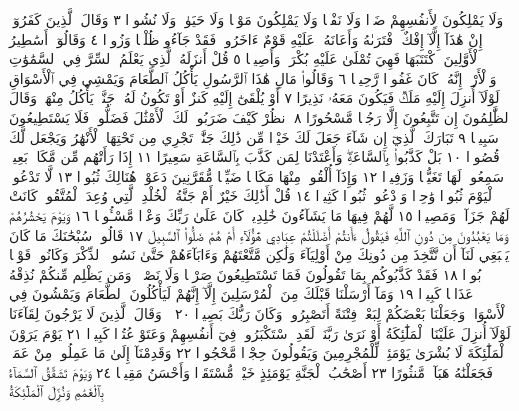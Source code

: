 وَلَا يَمْلِكُونَ لِأَنفُسِهِمْ ضَرࣰّا وَلَا نَفْعࣰا وَلَا يَمْلِكُونَ مَوْتࣰا
وَلَا حَيَوٰةࣰ وَلَا نُشُورࣰا ٣ وَقَالَ ٱلَّذِينَ كَفَرُوٓا۟ إِنْ هَٰذَآ إِلَّآ
إِفْكٌ ٱفْتَرَىٰهُ وَأَعَانَهُۥ عَلَيْهِ قَوْمٌ ءَاخَرُونَۖ فَقَدْ جَآءُو ظُلْمࣰا
وَزُورࣰا ٤ وَقَالُوٓا۟ أَسَٰطِيرُ ٱلْأَوَّلِينَ ٱكْتَتَبَهَا فَهِيَ تُمْلَىٰ
عَلَيْهِ بُكْرَةࣰ وَأَصِيلࣰا ٥ قُلْ أَنزَلَهُ ٱلَّذِي يَعْلَمُ ٱلسِّرَّ
فِي ٱلسَّمَٰوَٰتِ وَٱلْأَرْضِۚ إِنَّهُۥ كَانَ غَفُورࣰا رَّحِيمࣰا ٦
وَقَالُوا۟ مَالِ هَٰذَا ٱلرَّسُولِ يَأْكُلُ ٱلطَّعَامَ وَيَمْشِي فِي
ٱلْأَسْوَاقِ لَوْلَآ أُنزِلَ إِلَيْهِ مَلَكࣱ فَيَكُونَ مَعَهُۥ نَذِيرًا ٧
أَوْ يُلْقَىٰٓ إِلَيْهِ كَنزٌ أَوْ تَكُونُ لَهُۥ جَنَّةࣱ يَأْكُلُ مِنْهَاۚ وَقَالَ
ٱلظَّٰلِمُونَ إِن تَتَّبِعُونَ إِلَّا رَجُلࣰا مَّسْحُورًا ٨ ٱنظُرْ
كَيْفَ ضَرَبُوا۟ لَكَ ٱلْأَمْثَٰلَ فَضَلُّوا۟ فَلَا يَسْتَطِيعُونَ
سَبِيلࣰا ٩ تَبَارَكَ ٱلَّذِيٓ إِن شَآءَ جَعَلَ لَكَ خَيْرࣰا مِّن ذَٰلِكَ
جَنَّٰتࣲ تَجْرِي مِن تَحْتِهَا ٱلْأَنْهَٰرُ وَيَجْعَل لَّكَ قُصُورَۢا ١٠ بَلْ
كَذَّبُوا۟ بِٱلسَّاعَةِۖ وَأَعْتَدْنَا لِمَن كَذَّبَ بِٱلسَّاعَةِ سَعِيرًا ١١
إِذَا رَأَتْهُم مِّن مَّكَانِۭ بَعِيدࣲ سَمِعُوا۟ لَهَا تَغَيُّظࣰا وَزَفِيرࣰا ١٢
وَإِذَآ أُلْقُوا۟ مِنْهَا مَكَانࣰا ضَيِّقࣰا مُّقَرَّنِينَ دَعَوْا۟ هُنَالِكَ ثُبُورࣰا ١٣
لَّا تَدْعُوا۟ ٱلْيَوْمَ ثُبُورࣰا وَٰحِدࣰا وَٱدْعُوا۟ ثُبُورࣰا كَثِيرࣰا ١٤
قُلْ أَذَٰلِكَ خَيْرٌ أَمْ جَنَّةُ ٱلْخُلْدِ ٱلَّتِي وُعِدَ ٱلْمُتَّقُونَۚ كَانَتْ
لَهُمْ جَزَآءࣰ وَمَصِيرࣰا ١٥ لَّهُمْ فِيهَا مَا يَشَآءُونَ خَٰلِدِينَۚ
كَانَ عَلَىٰ رَبِّكَ وَعْدࣰا مَّسْـُٔولࣰا ١٦ وَيَوْمَ يَحْشُرُهُمْ وَمَا
يَعْبُدُونَ مِن دُونِ ٱللَّهِ فَيَقُولُ ءَأَنتُمْ أَضْلَلْتُمْ عِبَادِي
هَٰٓؤُلَآءِ أَمْ هُمْ ضَلُّوا۟ ٱلسَّبِيلَ ١٧ قَالُوا۟ سُبْحَٰنَكَ مَا كَانَ
يَنۢبَغِي لَنَآ أَن نَّتَّخِذَ مِن دُونِكَ مِنْ أَوْلِيَآءَ وَلَٰكِن مَّتَّعْتَهُمْ
وَءَابَآءَهُمْ حَتَّىٰ نَسُوا۟ ٱلذِّكْرَ وَكَانُوا۟ قَوْمَۢا بُورࣰا ١٨
فَقَدْ كَذَّبُوكُم بِمَا تَقُولُونَ فَمَا تَسْتَطِيعُونَ صَرْفࣰا
وَلَا نَصْرࣰاۚ وَمَن يَظْلِم مِّنكُمْ نُذِقْهُ عَذَابࣰا كَبِيرࣰا ١٩
وَمَآ أَرْسَلْنَا قَبْلَكَ مِنَ ٱلْمُرْسَلِينَ إِلَّآ إِنَّهُمْ لَيَأْكُلُونَ
ٱلطَّعَامَ وَيَمْشُونَ فِي ٱلْأَسْوَاقِۗ وَجَعَلْنَا بَعْضَكُمْ
لِبَعْضࣲ فِتْنَةً أَتَصْبِرُونَۗ وَكَانَ رَبُّكَ بَصِيرࣰا ٢٠
۞ وَقَالَ ٱلَّذِينَ لَا يَرْجُونَ لِقَآءَنَا لَوْلَآ أُنزِلَ عَلَيْنَا ٱلْمَلَٰٓئِكَةُ
أَوْ نَرَىٰ رَبَّنَاۗ لَقَدِ ٱسْتَكْبَرُوا۟ فِيٓ أَنفُسِهِمْ وَعَتَوْ عُتُوࣰّا كَبِيرࣰا ٢١
يَوْمَ يَرَوْنَ ٱلْمَلَٰٓئِكَةَ لَا بُشْرَىٰ يَوْمَئِذࣲ لِّلْمُجْرِمِينَ وَيَقُولُونَ
حِجْرࣰا مَّحْجُورࣰا ٢٢ وَقَدِمْنَآ إِلَىٰ مَا عَمِلُوا۟ مِنْ عَمَلࣲ فَجَعَلْنَٰهُ
هَبَآءࣰ مَّنثُورًا ٢٣ أَصْحَٰبُ ٱلْجَنَّةِ يَوْمَئِذٍ خَيْرࣱ مُّسْتَقَرࣰّا
وَأَحْسَنُ مَقِيلࣰا ٢٤ وَيَوْمَ تَشَقَّقُ ٱلسَّمَآءُ بِٱلْغَمَٰمِ وَنُزِّلَ ٱلْمَلَٰٓئِكَةُ
